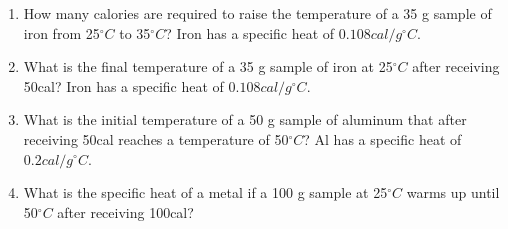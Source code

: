 \documentclass[main.tex]{subfiles}
\begin{document}
\begin{multicols*}{2}
\begin{enumerate}
\item How many calories are required to raise the temperature of a 35 g sample of iron from 25$^{\circ}C$ to 35$^{\circ}C$?  Iron has a specific heat of $0.108cal/g^{\circ}C$.
\begin{enumerate}[label=(\alph*)]\end{enumerate}
\item What is the final temperature of a 35 g sample of iron at 25$^{\circ}C$ after receiving 50cal?  Iron has a specific heat of $0.108cal/g^{\circ}C$.
\begin{enumerate}[label=(\alph*)]\end{enumerate}

\item What is the initial temperature of a 50 g sample of aluminum that after receiving 50cal reaches a temperature of 50$^{\circ}C$?  Al has a specific heat of $0.2cal/g^{\circ}C$.
\begin{enumerate}[label=(\alph*)]\end{enumerate}

\item What is the specific heat of a metal if a 100 g sample at 25$^{\circ}C$ warms up until 50$^{\circ}C$ after receiving 100cal?  
\begin{enumerate}[label=(\alph*)]\end{enumerate}



\end{enumerate}
\end{multicols*}
\end{document}
